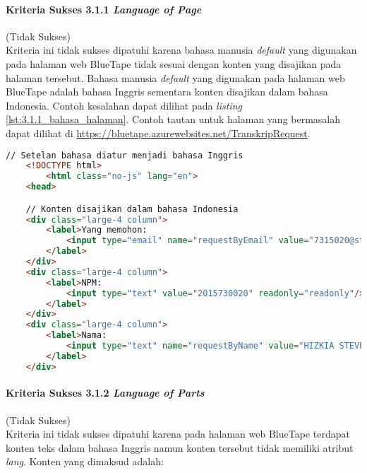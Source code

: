 \paragraph{Kriteria Sukses 3.1.1 \textit{Language of Page}}
\label{par:kepatuhan_bluetape_kriteria_sukses_3.1.1}
(Tidak Sukses)\\

Kriteria ini tidak sukses dipatuhi karena bahasa manusia \textit{default} yang digunakan pada halaman web BlueTape tidak sesuai dengan konten yang disajikan pada halaman tersebut. Bahasa manusia \textit{default} yang digunakan pada halaman web BlueTape adalah bahasa Inggris sementara konten disajikan dalam bahasa Indonesia. Contoh kesalahan dapat dilihat pada \textit{listing} \ref{lst:3.1.1_bahasa_halaman}. Contoh tautan untuk halaman yang bermasalah dapat dilihat di \url{https://bluetape.azurewebsites.net/TranskripRequest}.

\begin{lstlisting}[frame=single, label={lst:3.1.1_bahasa_halaman}, language=HTML, caption=Pelanggaran Kriteria Sukses 3.1.1 pada Halaman Cetak Transkrip]
    // Setelan bahasa diatur menjadi bahasa Inggris
    <!DOCTYPE html>
        <html class="no-js" lang="en">
    <head>

    // Konten disajikan dalam bahasa Indonesia
    <div class="large-4 column">
        <label>Yang memohon:
            <input type="email" name="requestByEmail" value="7315020@student.unpar.ac.id" readonly="readonly"/>
        </label>
    </div>
    <div class="large-4 column">
        <label>NPM:
            <input type="text" value="2015730020" readonly="readonly"/>
        </label>
    </div>
    <div class="large-4 column">
        <label>Nama:
            <input type="text" name="requestByName" value="HIZKIA STEVEN" readonly="readonly"/>
        </label>
    </div>
\end{lstlisting}

\paragraph{Kriteria Sukses 3.1.2 \textit{Language of Parts}}
\label{par:kepatuhan_bluetape_kriteria_sukses_3.1.2}
(Tidak Sukses)\\

Kriteria ini tidak sukses dipatuhi karena pada halaman web BlueTape terdapat konten teks dalam bahasa Inggris namun konten tersebut tidak memiliki atribut \textit{lang}. Konten yang dimaksud adalah:

